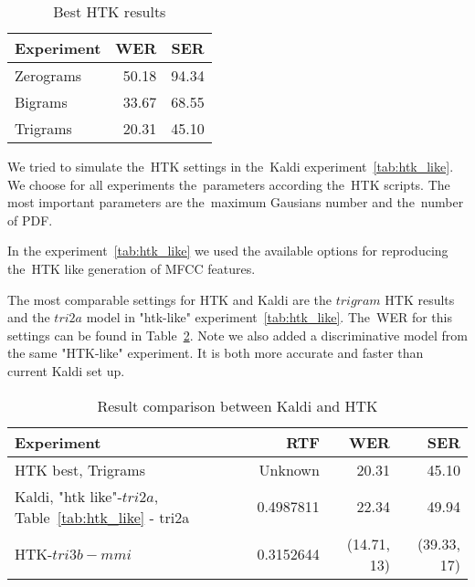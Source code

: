 \begin{table}[!htp]\label{tab:htk_res}\centering\begin{tabular}{l|rr}
Experiment      & \ac{WER} & \ac{SER} \\
\hline
    Zerograms      & 50.18  & 94.34  \\
    Bigrams        & 33.67  & 68.55  \\
    Trigrams       & 20.31  & 45.10  \\
\end{tabular}
\caption{Best \ac{HTK} results}
\end{table}  


We tried to simulate the~\ac{HTK} settings in the~Kaldi experiment~\ref{tab:htk_like}.
We choose for all experiments the~parameters according the~\ac{HTK} scripts.
The most important parameters are the~maximum Gausians number and the~number of \acl{PDF}.

In the experiment~\ref{tab:htk_like} we used the available options for reproducing the~\ac{HTK} like generation
of \ac{MFCC} features.

The most comparable settings for \ac{HTK} and Kaldi are the $trigram$ \ac{HTK} results
and the $tri2a$ model in "htk-like" experiment~\ref{tab:htk_like}. 
The~\ac{WER} for this settings can be found in Table~\ref{tab:compare}.
Note we also added a discriminative model from the same "\ac{HTK}-like" experiment.
It is both more accurate and faster than current Kaldi set up.

\begin{table}[!htp]\label{tab:compare}\centering\begin{tabular}{l|rrr}
    Experiment   & \ac{RTF} & \ac{WER} & \ac{SER} \\
\hline
\hline
\ac{HTK} best, Trigrams   & Unknown  & 20.31  & 45.10  \\
Kaldi, "htk like"-$tri2a$, Table~\ref{tab:htk_like} - tri2a & 0.4987811 & 22.34 & 49.94\\
\hline
\ac{HTK}-$tri3b-mmi$       & 0.3152644     & (14.71, 13) & (39.33, 17)\\ 
\end{tabular} \caption{Result comparison between Kaldi and \ac{HTK}} \end{table}  

